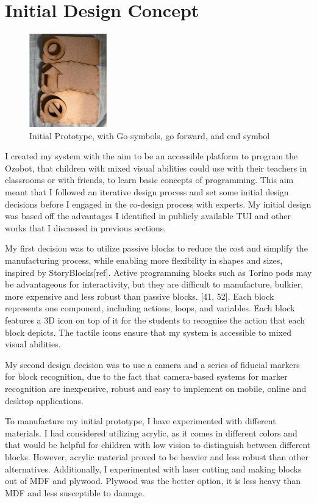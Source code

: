\documentclass[oneside,%
                    author={Malak Hajji},
                    degree={BSc},
                    title={Designing An Accessible Computational Toolkit For Students},
                  subtitle={With Mixed Visual Abilities}]{dissertation}
\begin{document}
\section{Initial Design Concept}
\begin{figure}
    \centering
    \includegraphics[width=0.3\textwidth]{thesis/initial-block.eps}
    \caption{Initial Prototype, with Go symbols, go forward, and end symbol}
    \label{fig-initial}
\end{figure}
I created my system with the aim to be an accessible platform to program the Ozobot, that children with mixed visual abilities could use with their teachers in classrooms or with friends, to learn basic concepts of programming. This aim meant that I followed an iterative design process and set some initial design decisions before I engaged in the co-design process with experts. My initial design was based off the advantages I identified in publicly available TUI and other works that I discussed in previous sections.

My first decision was to utilize passive blocks to reduce the cost and simplify the manufacturing process, while enabling more flexibility in shapes and sizes, inspired by StoryBlocks[ref].  Active programming blocks such as Torino pods may be advantageous for interactivity, but they are difficult to manufacture, bulkier, more expensive and less robust than passive blocks. [41, 52].  Each block represents one component, including actions, loops, and variables. Each block features a 3D icon on top of it for the students to recognise the action that each block depicts. The tactile icons ensure that my system is accessible to mixed visual abilities.

My second design decision was to use a camera and a series of fiducial markers for block recognition, due to the fact that camera-based systems for marker recognition are inexpensive, robust and easy to implement on mobile, online and desktop applications.

To manufacture my initial prototype, I have experimented with different materials. I had considered utilizing acrylic, as it comes in different colors and that would be helpful for children with low vision to distinguish between different blocks. However, acrylic material proved to be heavier and less robust than other alternatives. Additionally, I experimented with laser cutting and making blocks out of MDF and plywood. Plywood was the better option, it is less heavy than MDF and less susceptible to damage. 
\end{document}
